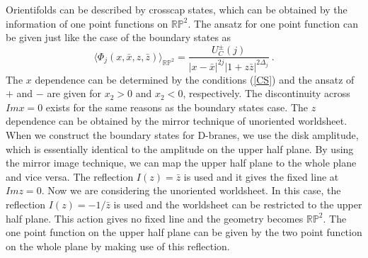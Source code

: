 \documentclass[a4paper,12pt]{article}
\newcommand{\brp}{{\mathbb R \mathbb P}^2}
\begin{document}
Orientifolds can be described by crosscap states, which can be
obtained by the information of one point functions on $\brp$. 
The ansatz for one point function can be given just like the
case of the boundary states as
\begin{equation}
 \langle \Phi_j (x,\bar{x},z,\bar{z}) \rangle _ {\brp} =
   \frac{U^{\pm}_{C} (j)}{|x-\bar{x}|^{2j} |1 + z \bar{z}|^{2 \Delta_j} }~. 
\end{equation} 
The $x$ dependence can be determined by the conditions (\ref{CS}) and
the ansatz of $+$ and $-$ are given for $x_2 >0$ and $x_2 < 0$,
respectively. 
The discontinuity across $Im x = 0$ exists for the same reasons as the
boundary states case.
The $z$ dependence can be obtained by the mirror technique
of unoriented worldsheet.
When we construct the boundary states for D-branes, we use the disk
amplitude, which is essentially identical to the amplitude on the upper half
plane. By using the mirror image technique, we can map the upper half
plane to the whole plane and vice versa. 
The reflection $I(z) = \bar{z}$ is used and it gives the fixed line at
$Im z = 0$.   
Now we are considering the unoriented worldsheet.
In this case, the reflection $I(z) = -1 / \bar{z}$ is used and the
worldsheet can be restricted to the upper half plane. 
This action gives no fixed line and the geometry becomes $\brp$.  
The one point function on the upper half plane can be given by the two
point function on the whole plane by making use of this reflection.
\end{document}
